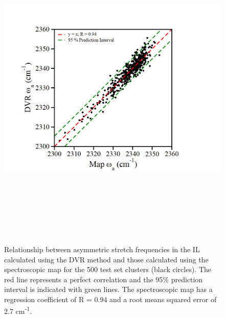 \documentclass[]{article}
\begin{document}
\begin{figure}
  \centering
  \includegraphics[width=6.22356in,height=6.29517in]{figure2.png}
  \caption{Relationship between  asymmetric stretch frequencies in the \ce{[C4C1im][PF6]} IL calculated using the DVR method and those calculated using the spectroscopic map for the 500 test set clusters (black circles). The red line represents a perfect correlation and the 95\% prediction interval is indicated with green lines. The spectroscopic map has a regression coefficient of R = 0.94 and a root means squared error of 2.7 cm\textsuperscript{-1}.}
  \label{paper_03:fig2}
\end{figure}
\end{document}
